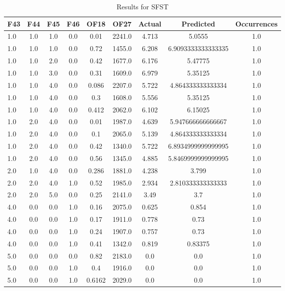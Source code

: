 \clearpage
\begin{table}[htbp]
\centering
\begin{tabular}{|l|c|c|c|c|c|c|c|c|}
\hline
F43 & F44 & F45 & F46 & OF18 & OF27 & Actual & Predicted & Occurrences \\
\hline
1.0 & 1.0 & 1.0 & 0.0 & 0.01 & 2241.0 & 4.713 & 5.0555 & 1.0 \\
1.0 & 1.0 & 1.0 & 0.0 & 0.72 & 1455.0 & 6.208 & 6.9093333333333335 & 1.0 \\
1.0 & 1.0 & 2.0 & 0.0 & 0.42 & 1677.0 & 6.176 & 5.47775 & 1.0 \\
1.0 & 1.0 & 3.0 & 0.0 & 0.31 & 1609.0 & 6.979 & 5.35125 & 1.0 \\
1.0 & 1.0 & 4.0 & 0.0 & 0.086 & 2207.0 & 5.722 & 4.864333333333334 & 1.0 \\
1.0 & 1.0 & 4.0 & 0.0 & 0.3 & 1608.0 & 5.556 & 5.35125 & 1.0 \\
1.0 & 1.0 & 4.0 & 0.0 & 0.412 & 2062.0 & 6.102 & 6.15025 & 1.0 \\
1.0 & 2.0 & 4.0 & 0.0 & 0.01 & 1987.0 & 4.639 & 5.947666666666667 & 1.0 \\
1.0 & 2.0 & 4.0 & 0.0 & 0.1 & 2065.0 & 5.139 & 4.864333333333334 & 1.0 \\
1.0 & 2.0 & 4.0 & 0.0 & 0.42 & 1340.0 & 5.722 & 6.8934999999999995 & 1.0 \\
1.0 & 2.0 & 4.0 & 0.0 & 0.56 & 1345.0 & 4.885 & 5.8469999999999995 & 1.0 \\
2.0 & 1.0 & 4.0 & 0.0 & 0.286 & 1881.0 & 4.238 & 3.799 & 1.0 \\
2.0 & 2.0 & 4.0 & 1.0 & 0.52 & 1985.0 & 2.934 & 2.810333333333333 & 1.0 \\
2.0 & 2.0 & 5.0 & 0.0 & 0.25 & 2141.0 & 3.49 & 3.7 & 1.0 \\
4.0 & 0.0 & 0.0 & 1.0 & 0.16 & 2075.0 & 0.625 & 0.854 & 1.0 \\
4.0 & 0.0 & 0.0 & 1.0 & 0.17 & 1911.0 & 0.778 & 0.73 & 1.0 \\
4.0 & 0.0 & 0.0 & 1.0 & 0.24 & 1907.0 & 0.757 & 0.73 & 1.0 \\
4.0 & 0.0 & 0.0 & 1.0 & 0.41 & 1342.0 & 0.819 & 0.83375 & 1.0 \\
5.0 & 0.0 & 0.0 & 0.0 & 0.82 & 2183.0 & 0.0 & 0.0 & 1.0 \\
5.0 & 0.0 & 0.0 & 1.0 & 0.4 & 1916.0 & 0.0 & 0.0 & 1.0 \\
5.0 & 0.0 & 0.0 & 1.0 & 0.6162 & 2029.0 & 0.0 & 0.0 & 1.0 \\
\hline
\end{tabular}
\caption{Results for SFST}
\label{tab:SFST_results}
\end{table}
